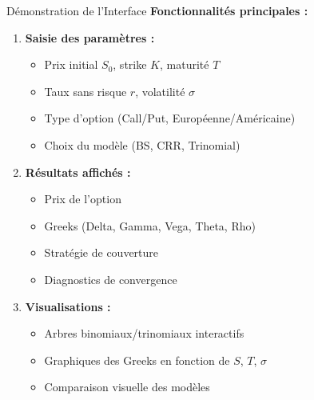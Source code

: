 \documentclass[aspectratio=169, 10pt]{beamer}
\begin{document}
\begin{frame}{Démonstration de l'Interface}
    \textbf{Fonctionnalités principales :}
    
    \begin{enumerate}
        \item \textbf{Saisie des paramètres :}
        \begin{itemize}
            \item Prix initial $S_0$, strike $K$, maturité $T$
            \item Taux sans risque $r$, volatilité $\sigma$
            \item Type d'option (Call/Put, Européenne/Américaine)
            \item Choix du modèle (BS, CRR, Trinomial)
        \end{itemize}
        
        \item \textbf{Résultats affichés :}
        \begin{itemize}
            \item Prix de l'option
            \item Greeks (Delta, Gamma, Vega, Theta, Rho)
            \item Stratégie de couverture
            \item Diagnostics de convergence
        \end{itemize}
        
        \item \textbf{Visualisations :}
        \begin{itemize}
            \item Arbres binomiaux/trinomiaux interactifs
            \item Graphiques des Greeks en fonction de $S$, $T$, $\sigma$
            \item Comparaison visuelle des modèles
        \end{itemize}
    \end{enumerate}
\end{frame}
\end{document}
